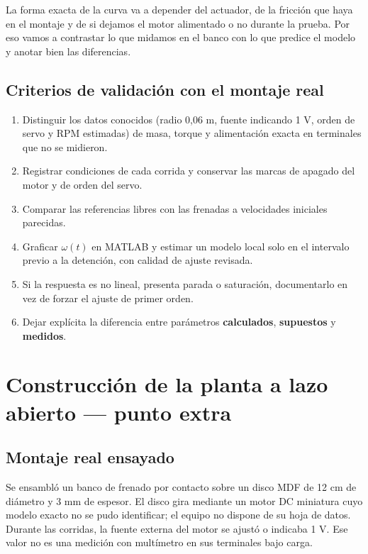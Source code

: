 \documentclass[9pt,a4paper,twocolumn]{extarticle}
\providecommand{\tightlist}{%
    \setlength{\itemsep}{0pt}%
    \setlength{\parskip}{0pt}%
}
\begin{document}
La forma exacta de la curva va a depender del actuador, de la fricción que haya en el montaje y de si dejamos el motor alimentado o no durante la prueba. Por eso vamos a contrastar lo que midamos en el banco con lo que predice el modelo y anotar bien las diferencias.

\subsection{Criterios de validación con el montaje real}
\label{procedimiento-de-validaciuxf3n-cuando-exista-hardware}

\begin{enumerate}
\def\labelenumi{\arabic{enumi}.}
\tightlist
\item
  Distinguir los datos conocidos (radio 0,06 m, fuente indicando 1 V,
  orden de servo y RPM estimadas) de masa, torque y alimentación exacta
  en terminales que no se midieron.
\item
  Registrar condiciones de cada corrida y conservar las marcas de
  apagado del motor y de orden del servo.
\item
  Comparar las referencias libres con las frenadas a velocidades
  iniciales parecidas.
\item
  Graficar \(\omega(t)\) en MATLAB y estimar un modelo local solo en el
  intervalo previo a la detención, con calidad de ajuste revisada.
\item
  Si la respuesta es no lineal, presenta parada o saturación,
  documentarlo en vez de forzar el ajuste de primer orden.
\item
  Dejar explícita la diferencia entre parámetros \textbf{calculados},
  \textbf{supuestos} y \textbf{medidos}.
\end{enumerate}

\section{Construcción de la planta a lazo abierto --- punto extra}

\subsection{Montaje real ensayado}

Se ensambló un banco de frenado por contacto sobre un disco MDF de
12 cm de diámetro y 3 mm de espesor. El disco gira mediante un motor
DC miniatura cuyo modelo exacto no se pudo identificar; el equipo no
dispone de su hoja de datos. Durante las corridas,
la fuente externa del motor se ajustó o indicaba 1 V. Ese valor no es
una medición con multímetro en sus terminales bajo carga.
\end{document}
